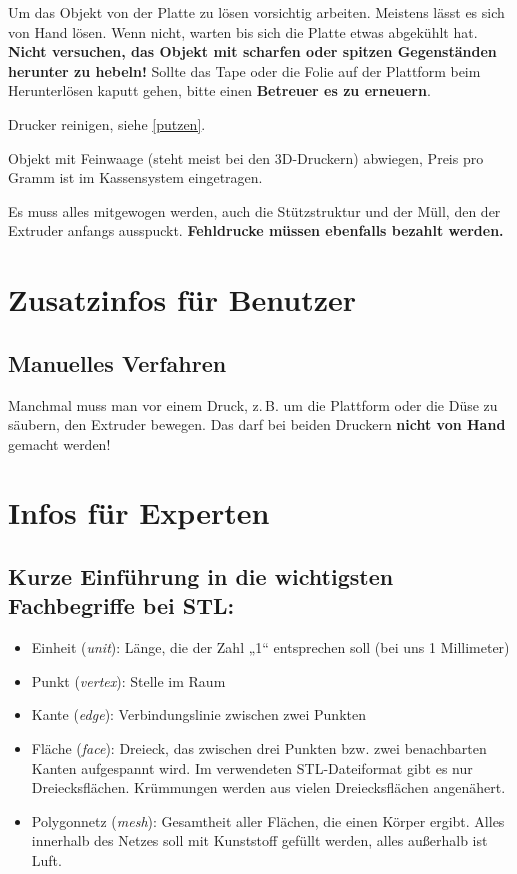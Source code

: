 \documentclass{\basedir/fablab-document}
\newcommand{\fachbegriff}[1]{(\textit{#1})}
\begin{document}
Um das Objekt von der Platte zu lösen vorsichtig arbeiten. Meistens lässt es sich von Hand lösen. Wenn nicht,
warten bis sich die Platte etwas abgekühlt hat. \textbf{Nicht versuchen, das Objekt mit scharfen oder spitzen Gegenständen herunter zu hebeln!}
Sollte das Tape oder die Folie auf der Plattform beim Herunterlösen kaputt gehen, bitte einen \textbf{Betreuer es zu erneuern}.

Drucker reinigen, siehe \ref{putzen}.

Objekt mit Feinwaage (steht meist bei den 3D-Druckern) abwiegen, Preis pro Gramm ist im Kassensystem eingetragen.

Es muss alles mitgewogen werden, auch die Stützstruktur und der Müll, den der Extruder anfangs ausspuckt. \textbf{Fehldrucke müssen ebenfalls bezahlt werden.}
\pagebreak


\section{Zusatzinfos für Benutzer}

\subsection{Manuelles Verfahren}\label{manuelles-verfahren}
Manchmal muss man vor einem Druck, z.\,B. um die Plattform oder die Düse zu säubern, den Extruder bewegen.
Das darf bei beiden Druckern \textbf{nicht von Hand} gemacht werden!


\section{Infos für Experten}

\subsection{Kurze Einführung in die wichtigsten Fachbegriffe bei STL:}

\begin{itemize}
\item Einheit \fachbegriff{unit}: Länge, die der Zahl „1“ entsprechen soll (bei uns
1 Millimeter)
\item Punkt \fachbegriff{vertex}: Stelle im Raum
\item Kante \fachbegriff{edge}: Verbindungslinie zwischen zwei Punkten
\item Fläche \fachbegriff{face}: Dreieck, das zwischen drei Punkten bzw. zwei
benachbarten Kanten aufgespannt wird. Im verwendeten STL-Dateiformat
gibt es nur Dreiecksflächen. Krümmungen werden aus vielen
Dreiecksflächen angenähert.
\item Polygonnetz \fachbegriff{mesh}: Gesamtheit aller Flächen, die einen Körper
ergibt. Alles innerhalb des Netzes soll mit Kunststoff gefüllt werden,
alles außerhalb ist Luft.
\end{itemize}
\end{document}
